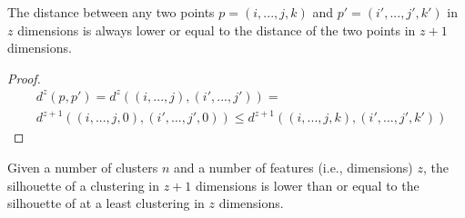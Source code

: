 
\begin{theorem}\label{th:dist}
The distance between any two points $p=(i,...,j,k)$ and $p'=(i', ...,j',k')$ in $z$ dimensions is always lower or equal to the distance of the two points in $z+1$ dimensions.
\end{theorem}

\begin{proof}
\begin{align*}
    &d^{z}(p,p') = d^z((i, ..., j), (i',...,j')) = \\
    &d^{z+1}((i,...,j,0), (i',...,j',0)) \le d^{z+1}((i,...,j,k), (i',...,j',k'))
\end{align*}
\eop
\end{proof}

\begin{theorem}
Given a number of clusters $n$ and a number of features (i.e., dimensions) $z$, the silhouette of a clustering in $z + 1$ dimensions is lower than or equal to the silhouette of at a least clustering in $z$ dimensions.
\end{theorem}


